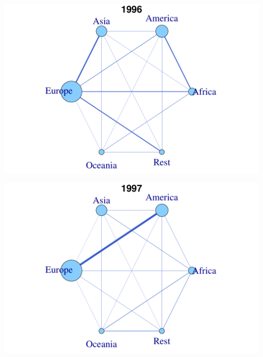 \documentclass[a4paper,ngerman,oneside,titlepage,bibliography=totoc,11pt]{scrreprt}
\begin{document}
\begin{minipage}[t]{0.48\textwidth}
		\centering
			\includegraphics[width=1\textwidth]{Grafiken/Cont_Ani/cont5.pdf}
\end{minipage}	
\hfill	
\begin{minipage}[t]{0.48\textwidth}	
			\centering
			\includegraphics[width=1\textwidth]{Grafiken/Cont_Ani/cont6.pdf}
\end{minipage}
\end{document}
